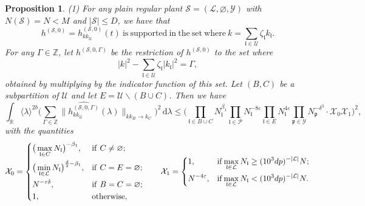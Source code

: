 \documentclass[11 pt,reqno]{amsart}
\newtheorem{prop}[thm]{Proposition}
\theoremstyle{definition}
\theoremstyle{remark}
\numberwithin{equation}{section}
\newcommand{\Sc}{\mathcal{S}}
\newcommand{\Lc}{\mathcal{L}}
\newcommand{\Pc}{\mathcal{P}}
\newcommand{\Uc}{\mathcal{U}}
\newcommand{\Xc}{\mathcal{X}}
\newcommand{\Yc}{\mathcal{Y}}
\newcommand{\Rb}{\mathbb{R}}
\newcommand{\Zb}{\mathbb{Z}}
\newcommand{\pf}{\mathfrak{p}}
\newcommand{\lf}{\mathfrak{l}}
\begin{document}
{\begin{prop}
(1) For any plain regular plant $\Sc=(\Lc,\varnothing,\Yc)$ with $N(\Sc)=N< M$ and $|\Sc|\leq D$, we have that
\begin{equation}\label{support01} h^{(\Sc,0)}=h_{kk_\Uc}^{(\Sc,0)}(t)\mathrm{\ is\ supported\ in\ the\ set\ where\ }k=\sum_{\lf\in\Uc}\zeta_\lf k_\lf.
\end{equation}For any $\Gamma\in\Zb$, let $h^{(\Sc,0,\Gamma)}$ be the restriction of $h^{(\Sc,0)}$ to the set where
 \begin{equation}\label{support02} |k|^2-\sum_{\lf\in\Uc}\zeta_\lf|k_\lf|^2=\Gamma,
 \end{equation} obtained by multiplying by the indicator function of this set. Let $(B,C)$ be a subpartition of $\Uc$ and let $E=\Uc\backslash(B\cup C)$. Then we have
 \begin{equation}\label{estimate01}\int_\Rb\langle \lambda\rangle^{2b}\bigg(\sum_{\Gamma\in\Zb}\|\widehat{h_{kk_\Uc}^{(\Sc,0,\Gamma)}}(\lambda)\|_{kk_B\to k_C}\bigg)^2\,\mathrm{d}\lambda\leq\bigg(\prod_{\lf\in B\cup C}N_\lf^{\beta_1}\prod_{\lf\in\Pc}N_\lf^{-8\varepsilon}\prod_{\lf\in E}N_\lf^{4\varepsilon}\prod_{\pf\in\Yc}N_\pf^{-\delta^3}\cdot\Xc_0\Xc_1\bigg)^2,
 \end{equation} with the quantities
 \begin{equation}\label{estimate02}\Xc_0=\left\{
  \begin{aligned}&\big(\max_{\lf\in C}N_\lf\big)^{-\beta_1},&&\mathrm{if\ }C\neq\varnothing;\\
    & \big(\min_{\lf\in\Lc}N_\lf\big)^{\frac{d}{2}-\beta_1},&&\mathrm{if\ }C=E=\varnothing;\\
   & N^{-\varepsilon\delta},&&\mathrm{if\ }B=C=\varnothing;\\
    &1,&&\mathrm{otherwise},
 \end{aligned}
 \right.\qquad\Xc_1=\left\{
 \begin{aligned}&1,&{\rm{if }}\max_{\lf\in \Lc}N_\lf&\geq (10^3dp)^{-|\Lc|}N;\\
&N^{-4\varepsilon},&{\rm{if }}\max_{\lf\in \Lc}N_\lf&< (10^3dp)^{-|\Lc|}N.
 \end{aligned}
 \right.
 \end{equation}
 

\end{prop}}
\end{document}
